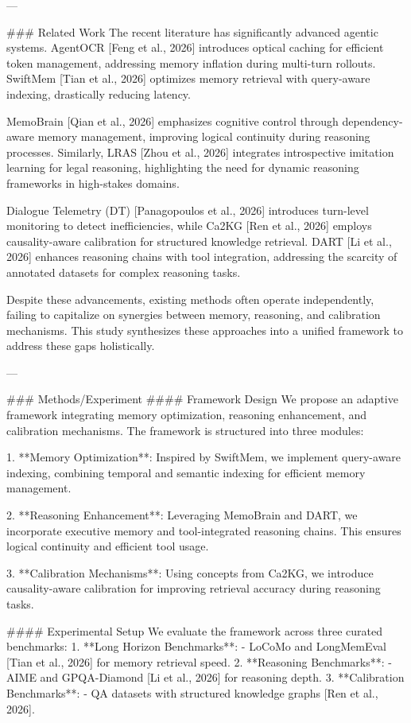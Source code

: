 ---

### Related Work
The recent literature has significantly advanced agentic systems. AgentOCR [Feng et al., 2026] introduces optical caching for efficient token management, addressing memory inflation during multi-turn rollouts. SwiftMem [Tian et al., 2026] optimizes memory retrieval with query-aware indexing, drastically reducing latency.

MemoBrain [Qian et al., 2026] emphasizes cognitive control through dependency-aware memory management, improving logical continuity during reasoning processes. Similarly, LRAS [Zhou et al., 2026] integrates introspective imitation learning for legal reasoning, highlighting the need for dynamic reasoning frameworks in high-stakes domains.

Dialogue Telemetry (DT) [Panagopoulos et al., 2026] introduces turn-level monitoring to detect inefficiencies, while Ca2KG [Ren et al., 2026] employs causality-aware calibration for structured knowledge retrieval. DART [Li et al., 2026] enhances reasoning chains with tool integration, addressing the scarcity of annotated datasets for complex reasoning tasks.

Despite these advancements, existing methods often operate independently, failing to capitalize on synergies between memory, reasoning, and calibration mechanisms. This study synthesizes these approaches into a unified framework to address these gaps holistically.

---

### Methods/Experiment
#### Framework Design
We propose an adaptive framework integrating memory optimization, reasoning enhancement, and calibration mechanisms. The framework is structured into three modules:

1. **Memory Optimization**:
   Inspired by SwiftMem, we implement query-aware indexing, combining temporal and semantic indexing for efficient memory management.

2. **Reasoning Enhancement**:
   Leveraging MemoBrain and DART, we incorporate executive memory and tool-integrated reasoning chains. This ensures logical continuity and efficient tool usage.

3. **Calibration Mechanisms**:
   Using concepts from Ca2KG, we introduce causality-aware calibration for improving retrieval accuracy during reasoning tasks.

#### Experimental Setup
We evaluate the framework across three curated benchmarks:
1. **Long Horizon Benchmarks**:
   - LoCoMo and LongMemEval [Tian et al., 2026] for memory retrieval speed.
2. **Reasoning Benchmarks**:
   - AIME and GPQA-Diamond [Li et al., 2026] for reasoning depth.
3. **Calibration Benchmarks**:
   - QA datasets with structured knowledge graphs [Ren et al., 2026].

